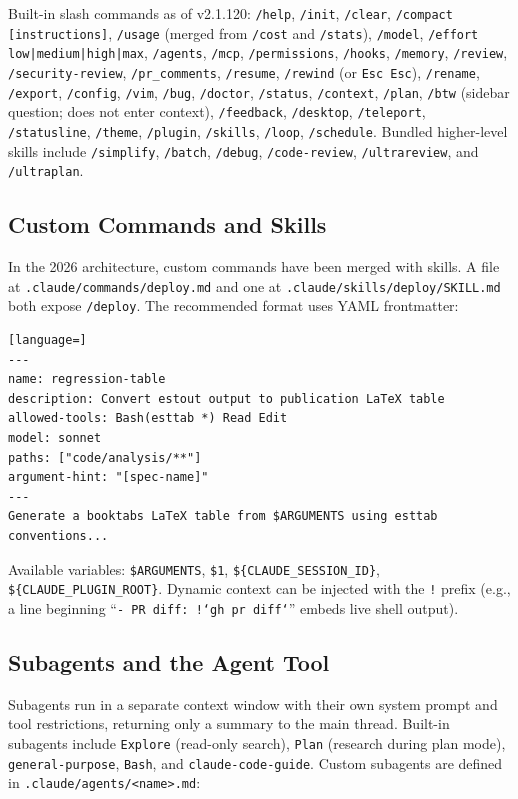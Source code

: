 \documentclass[11pt]{article}
\begin{document}
Built-in slash commands as of v2.1.120: \texttt{/help}, \texttt{/init}, \texttt{/clear}, \texttt{/compact [instructions]}, \texttt{/usage} (merged from \texttt{/cost} and \texttt{/stats}), \texttt{/model}, \texttt{/effort low|medium|high|max}, \texttt{/agents}, \texttt{/mcp}, \texttt{/permissions}, \texttt{/hooks}, \texttt{/memory}, \texttt{/review}, \texttt{/security-review}, \texttt{/pr\_comments}, \texttt{/resume}, \texttt{/rewind} (or \texttt{Esc Esc}), \texttt{/rename}, \texttt{/export}, \texttt{/config}, \texttt{/vim}, \texttt{/bug}, \texttt{/doctor}, \texttt{/status}, \texttt{/context}, \texttt{/plan}, \texttt{/btw} (sidebar question; does not enter context), \texttt{/feedback}, \texttt{/desktop}, \texttt{/teleport}, \texttt{/statusline}, \texttt{/theme}, \texttt{/plugin}, \texttt{/skills}, \texttt{/loop}, \texttt{/schedule}. Bundled higher-level skills include \texttt{/simplify}, \texttt{/batch}, \texttt{/debug}, \texttt{/code-review}, \texttt{/ultrareview}, and \texttt{/ultraplan}.

\subsection{Custom Commands and Skills}

In the 2026 architecture, custom commands have been merged with skills. A file at \texttt{.claude/commands/deploy.md} and one at \texttt{.claude/skills/deploy/SKILL.md} both expose \texttt{/deploy}. The recommended format uses YAML frontmatter:

\begin{lstlisting}[language=]
---
name: regression-table
description: Convert estout output to publication LaTeX table
allowed-tools: Bash(esttab *) Read Edit
model: sonnet
paths: ["code/analysis/**"]
argument-hint: "[spec-name]"
---
Generate a booktabs LaTeX table from $ARGUMENTS using esttab conventions...
\end{lstlisting}

Available variables: \texttt{\$ARGUMENTS}, \texttt{\$1}, \texttt{\$\{CLAUDE\_SESSION\_ID\}}, \texttt{\$\{CLAUDE\_PLUGIN\_ROOT\}}. Dynamic context can be injected with the \texttt{!} prefix (e.g., a line beginning ``\texttt{- PR diff: !`gh pr diff`}'' embeds live shell output).

\subsection{Subagents and the Agent Tool}

Subagents run in a separate context window with their own system prompt and tool restrictions, returning only a summary to the main thread. Built-in subagents include \texttt{Explore} (read-only search), \texttt{Plan} (research during plan mode), \texttt{general-purpose}, \texttt{Bash}, and \texttt{claude-code-guide}. Custom subagents are defined in \texttt{.claude/agents/<name>.md}:
\end{document}

